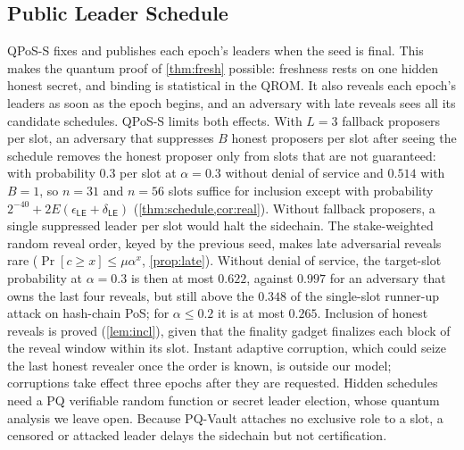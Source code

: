 \documentclass[10pt,journal,compsoc]{IEEEtran}
\theoremstyle{tplain}
\theoremstyle{tdef}
\theoremstyle{remark}
\begin{document}
\subsection{Public Leader Schedule}\label{S-disc-leader}
QPoS-S fixes and publishes each epoch's leaders when the seed is final. This makes the quantum proof of \cref{thm:fresh} possible: freshness rests on one hidden honest secret, and binding is statistical in the QROM. It also reveals each epoch's leaders as soon as the epoch begins, and an adversary with late reveals sees all its candidate schedules. QPoS-S limits both effects. With $L=3$ fallback proposers per slot, an adversary that suppresses $B$ honest proposers per slot after seeing the schedule removes the honest proposer only from slots that are not guaranteed: with probability $0.3$ per slot at $\alpha=0.3$ without denial of service and $0.514$ with $B=1$, so $n=31$ and $n=56$ slots suffice for inclusion except with probability $2^{-40}+2E(\epsilon_{\mathsf{LE}}+\delta_{\mathsf{LE}})$ (\cref{thm:schedule,cor:real}). Without fallback proposers, a single suppressed leader per slot would halt the sidechain. The stake-weighted random reveal order, keyed by the previous seed, makes late adversarial reveals rare ($\Pr[c\ge x]\le\mu\alpha^x$, \cref{prop:late}). Without denial of service, the target-slot probability at $\alpha=0.3$ is then at most $0.622$, against $0.997$ for an adversary that owns the last four reveals, but still above the $0.348$ of the single-slot runner-up attack on hash-chain PoS; for $\alpha\le0.2$ it is at most $0.265$. Inclusion of honest reveals is proved (\cref{lem:incl}), given that the finality gadget finalizes each block of the reveal window within its slot. Instant adaptive corruption, which could seize the last honest revealer once the order is known, is outside our model; corruptions take effect three epochs after they are requested. Hidden schedules need a PQ verifiable random function or secret leader election, whose quantum analysis we leave open. Because PQ-Vault attaches no exclusive role to a slot, a censored or attacked leader delays the sidechain but not certification.
\end{document}
